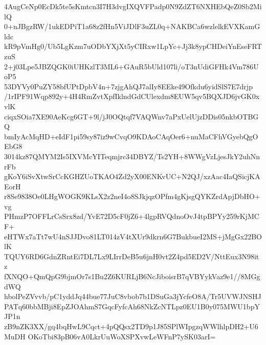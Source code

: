 4AugCeNp0EcDk5te5sKmtcn3I7H3dvgIXQVFPadp0N9ZdZT6NXHEbQeZ0Sb2MilQ
0+nJBgzRW/1ukEDPiT1a68z2fHn5ViJDlF3uZL0q+NAKBCa6wzlelkEVXKamGldc
kR9pVmHg0/Ub5LgKzm7uODbYXjXt5yCIRxw1LpYc+Jj3k8ypCHDeiYnEseFRTzuS
2+j03Lpe5JBZQGK0iUHKzlT3ML6+GAuR5bUld107li/oT3nUdiGFHk4Vm786UoP5
53DYVy0PuZY58bfUPtDpbV4n+7zjgAhQJ7alIy8EEke49Ofkdu6yidSlS7E7drjp
/1rIPF91Wqp892y+4H4RmZvtXpfIklndGdCUlexdm8EUW5qv5BQXJD6jvGK0xvlK
ciqxSOia7XE90AeKcg6GT+9l/jJ0OQtqf7VAQWnv7aPxUelUjzDDis05nkbOTBGQ
bmIyAcMqHD+eIdF1pi59sy87iz9wCvqO9KDAoCAqOer6+nuMaCFhVGyebQgOEbG8
3014kz87QMYM2Is5IXVMcYITeqmjrc34DBYZ/Ts2YH+8WWgVzLjesJkY2uhNnrFb
gKoY6iSvXtwSrCcKGHZUoTKAO4Zd2yX00ENKvUC+N2QJ/xzAac4IaQSicjKAEorH
r8Se9838Oe0LHgWOGK9KLsX2z2neI4o8SJkjqzOPfm4gKjsgQYKZrdApjDbHO+vg
PHmzP7OFFLrCsSrx8zd/YvE72D5cF0jZ6+4lgpRVQdnoOvJ4tpBPYy259rKjMCF+
eHTWx7aTt7wU4nSJJDvo81LT014zV4tXUr9dkrn6G7BukbueI2MS+jMgGx22BOlK
TQUY6RD6GdnZRntEi7DL7Lx9LIrrDeB5u6jnH0vt2Z4pd5ED2V/NttEux3N98itz
fXNQO+QmQpG9bjmOr7s1Bu2Z6KURLjB6NcJiboisrB7qVBYykVaz9e1//8MGgdWQ
hbolPeZVvvb/pC1yddJq44bue77JuC8vbob7b1DSuGa3jYcfeO8A/Tr5UVWJNSHJ
PATq60bbMBji8EpZJOAhmS7GqcFyfcAh68NkZcNTLpz0EU1B0y075MWU1bpYJP1n
zB9nZK3XX/gq4bqHwL9Cqct+4pQQsx2TD9p1J85SPlWIpgzqWWlhlpDH2+U6MuDH
OKoTbi83pB06vA0LkrUuWoXSPXvwLeWFnP7ySK03arI=
